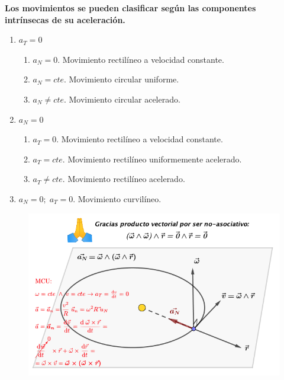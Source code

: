 \textbf{Los movimientos se pueden clasificar según las componentes intrínsecas de su aceleración. }
\vspace{-2mm}\begin{enumerate}
\vspace{-2mm}\item $a_T=0$ 
	\vspace{-2mm}\begin{enumerate}
	\vspace{-2mm}\item $a_N=0$. Movimiento rectilíneo a velocidad constante. 
	\vspace{-2mm}\item $a_N=cte$. Movimiento circular uniforme. 
	\vspace{-2mm}\item $a_N\neq cte$. Movimiento circular acelerado. 
	\vspace{-2mm}\end{enumerate}
\vspace{-2mm}\item $a_N=0$ 
	\vspace{-2mm}\begin{enumerate}
	\vspace{-2mm}\item $a_T=0$.   Movimiento rectilíneo a velocidad constante. 
	\vspace{-2mm}\item $a_T=cte$. Movimiento rectilíneo uniformemente acelerado. 
	\vspace{-2mm}\item $a_T\neq cte$. Movimiento rectilíneo acelerado. 
	\end{enumerate}
\vspace{-2mm}\item  $a_N=0;\; a_T=0$.  Movimiento curvilíneo.
\end{enumerate}

\vspace{25mm} %
\begin{figure}[H]
		\centering
		\includegraphics[width=1.1\textwidth]{imagenes/imagenes02/T02IM34.png}
		\end{figure}

